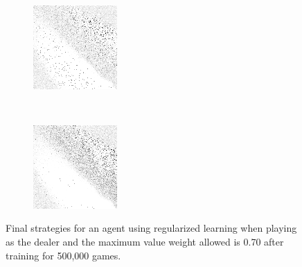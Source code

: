 \begin{figure}
\begin{subfigure}[t]{0.22\textwidth}
		\caption{\peggingmaxavggained}
	\end{subfigure}
~
	\begin{subfigure}[t]{0.22\textwidth}
		\center
		\includegraphics[width=\textwidth]{images/findings/experiments/regularization/strats/0.70/pegging_max_med_gained.png}
		\caption{\peggingmaxmedgained}
	\end{subfigure}
	~
	\begin{subfigure}[t]{0.22\textwidth}
		\center
		\includegraphics[width=\textwidth]{images/findings/experiments/regularization/strats/0.70/pegging_min_avg_given.png}
		\caption{\peggingminavggiven}
	\end{subfigure}

\caption{
	Final strategies for an agent using regularized learning
	when playing as the dealer
	and the maximum value weight allowed is 0.70
	after training for 500,000 games.
}
\label{fig:reg-strats-0.70}
\end{figure}

